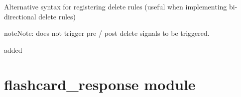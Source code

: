 \documentclass[letterpaper,10pt,english]{sphinxmanual}
\begin{document}
\begin{fulllineitems}
\begin{fulllineitems}
Alternative syntax for registering delete rules (useful when implementing
bi-directional delete rules)

\begin{sphinxVerbatim}[commandchars=\\\{\}]
 
      
      

  
\end{sphinxVerbatim}

\begin{sphinxadmonition}{note}{Note:}
 does not trigger pre / post delete signals to be
triggered.
\end{sphinxadmonition}

added 

\end{fulllineitems}


\end{fulllineitems}



\chapter{flashcard\_response module}
\label{\detokenize{flashcard_response:flashcard-response-module}}\label{\detokenize{flashcard_response::doc}}\label{\detokenize{flashcard_response:module-flashcard_response}}
\end{document}
